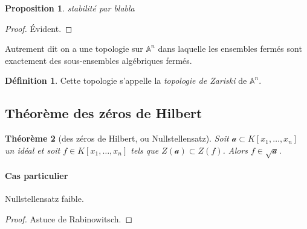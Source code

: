\documentclass[a4paper, 11pt]{article}
\newtheorem{théorème}{Théorème}
\newtheorem{proposition}[théorème]{Proposition}
\theoremstyle{definition}
\newtheorem{définition}{Définition}
\newcommand{\aff}{\mathbb{A}}
\begin{document}
\begin{proposition}
  stabilité par blabla
\end{proposition}
\begin{proof}
  Évident.
\end{proof}

Autrement dit on a une topologie sur $\aff^n$ dans laquelle les
ensembles fermés sont exactement des sous-ensembles algébriques
fermés.

\begin{définition}
  Cette topologie s'appelle la \emph{topologie de Zariski} de $\aff^n$.
\end{définition}

\subsection{Théorème des zéros de Hilbert}

\begin{théorème}[des zéros de Hilbert, ou Nullstellensatz]
  Soit $\mathcal{a} \subset K[x_1,\dots,x_n]$ un idéal et soit
  $f \in K[x_1,\dots,x_n]$ tels que $Z(\mathcal{a}) \subset
  Z(f)$. Alors $f \in \sqrt{\mathcal{a}}$.
\end{théorème}

\paragraph{Cas particulier} Nullstellensatz faible.

\begin{proof}
  Astuce de Rabinowitsch.
\end{proof}
\end{document}

